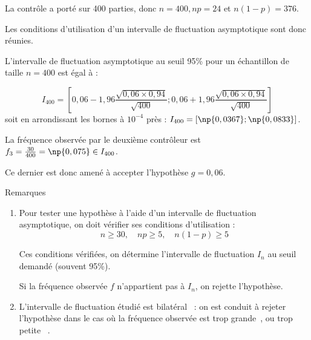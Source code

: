 \documentclass[12pt,french]{book}
\begin{document}
\begin{spacing}{1.2}
\begin{itemize}
La contrôle a porté sur 400 parties, donc $n=400, np=24$ et $n(1-p)=376$.

Les conditions d'utilisation d'un intervalle de fluctuation asymptotique sont donc réunies.

L'intervalle de fluctuation asymptotique au seuil 95\% pour un échantillon de taille $n=400$ est égal à :

\[I_{400}=\left[0,06-1,96\frac{\sqrt{0,06\times 0,94}}{\sqrt{400}};0,06+1,96\frac{\sqrt{0,06\times 0,94}}{\sqrt{400}}\right]\]
soit en arrondissant les bornes à $10^{-4}$ près : $I_{400}=[\np{0,0367};\np{0,0833}]$.

La fréquence observée par le deuxième contrôleur est $f_3=\frac{30}{400}= \np{0,075}\in I_{400}$.

Ce dernier est donc amené à accepter l'hypothèse $g=0,06$.

\end{itemize}

\medskip

\begin{bclogo}[couleur = gray!30 , arrondi = 0.1 ,logo = \bclampe , barre = snake , tailleOndu = 1.5]{Remarques}

\begin{enumerate}
\item Pour tester une hypothèse à l'aide d'un intervalle de fluctuation asymptotique, on doit vérifier ses conditions d'utilisation :
\[n\geq 30, \quad np\geq 5, \quad n(1-p)\geq 5\]

Ces conditions vérifiées, on détermine l'intervalle de fluctuation $I_n$ au seuil demandé (souvent 95\%).

Si la fréquence observée $f$ n'appartient pas à $I_n$, on rejette l'hypothèse.

\item L'intervalle de fluctuation étudié est \og bilatéral\fg~ : on est conduit à rejeter l'hypothèse dans le cas où la fréquence observée est \og trop grande\fg~, ou \og trop petite \fg~.
\end{enumerate}
\end{bclogo}




\end{spacing}

\end{document}
